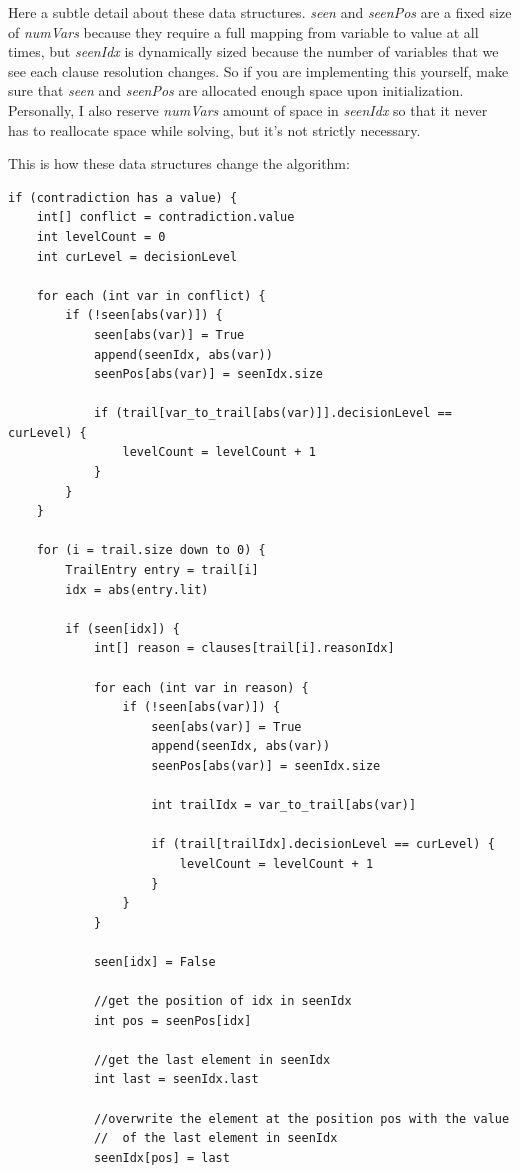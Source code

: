 \documentclass[../main.tex]{subfiles}
\begin{document}
\noindent
Here a subtle detail about these data structures. \textit{seen} and \textit{seenPos}
are a fixed size of \textit{numVars} because they require a full mapping from variable
to value at all times, but \textit{seenIdx} is dynamically sized because the number of 
variables that we see each clause resolution changes. So if you are implementing this 
yourself, make sure that \textit{seen} and \textit{seenPos} are allocated enough space 
upon initialization. Personally, I also reserve \textit{numVars} amount of space in 
\textit{seenIdx} so that it never has to reallocate space while solving, but it's not 
strictly necessary. 

This is how these data structures change the algorithm:
\begin{lstlisting}
if (contradiction has a value) {
    int[] conflict = contradiction.value
    int levelCount = 0
    int curLevel = decisionLevel

    for each (int var in conflict) {
        if (!seen[abs(var)]) {
            seen[abs(var)] = True 
            append(seenIdx, abs(var))
            seenPos[abs(var)] = seenIdx.size

            if (trail[var_to_trail[abs(var)]].decisionLevel == curLevel) {
                levelCount = levelCount + 1
            }
        }
    }

    for (i = trail.size down to 0) {
        TrailEntry entry = trail[i]
        idx = abs(entry.lit)

        if (seen[idx]) {
            int[] reason = clauses[trail[i].reasonIdx]

            for each (int var in reason) {
                if (!seen[abs(var)]) {
                    seen[abs(var)] = True 
                    append(seenIdx, abs(var))
                    seenPos[abs(var)] = seenIdx.size

                    int trailIdx = var_to_trail[abs(var)]

                    if (trail[trailIdx].decisionLevel == curLevel) {
                        levelCount = levelCount + 1
                    }
                }
            }

            seen[idx] = False

            //get the position of idx in seenIdx
            int pos = seenPos[idx]

            //get the last element in seenIdx
            int last = seenIdx.last

            //overwrite the element at the position pos with the value 
            //  of the last element in seenIdx
            seenIdx[pos] = last 


\end{lstlisting}
\end{document}
